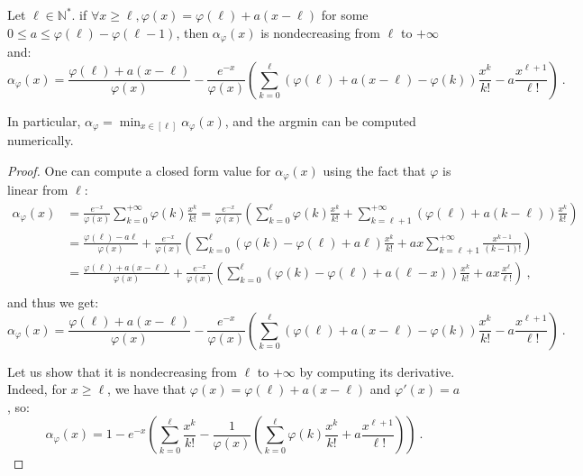 \begin{proposition}
  Let $\ell \in \mathbb{N}^*$. if $\forall x \geq \ell, \varphi(x) = \varphi(\ell) +a(x-\ell)$ for some $0 \leq a \leq \varphi(\ell)-\varphi(\ell-1)$, then $\alpha_{\varphi}(x)$ is nondecreasing from $\ell$ to $+\infty$ and:
  \[\alpha_{\varphi}(x) =  \frac{\varphi(\ell) + a(x-\ell)}{\varphi(x)} - \frac{e^{-x}}{\varphi(x)}\left(\sum_{k=0}^{\ell} \left(\varphi(\ell) + a(x-\ell) - \varphi(k)\right)\frac{x^k}{k!} - a\frac{x^{\ell+1}}{\ell!} \right) \ .\]
  
  In particular, $\alpha_{\varphi} = \min_{x \in [\ell]} \alpha_{\varphi}(x)$, and the argmin can be computed numerically.
  \label{prop:phiLinear}
\end{proposition}

\begin{proof}
  One can compute a closed form value for $\alpha_{\varphi}(x)$ using the fact that $\varphi$ is linear from $\ell$:
  \begin{equation}
    \begin{aligned}
    \alpha_{\varphi}(x) &= \frac{e^{-x}}{\varphi(x)}\sum_{k=0}^{+\infty}\varphi(k)\frac{x^k}{k!} = \frac{e^{-x}}{\varphi(x)}\left(\sum_{k=0}^{\ell}\varphi(k)\frac{x^k}{k!} + \sum_{k=\ell+1}^{+\infty}\left(\varphi(\ell)+a(k-\ell)\right)\frac{x^k}{k!} \right)\\
    &= \frac{\varphi(\ell)-a\ell}{\varphi(x)} + \frac{e^{-x}}{\varphi(x)}\left(\sum_{k=0}^{\ell}\left(\varphi(k) - \varphi(\ell) + a\ell\right)\frac{x^k}{k!} + ax\sum_{k=\ell+1}^{+\infty}\frac{x^{k-1}}{(k-1)!} \right)\\
    &= \frac{\varphi(\ell)+a(x-\ell)}{\varphi(x)} + \frac{e^{-x}}{\varphi(x)}\left(\sum_{k=0}^{\ell}\left(\varphi(k) - \varphi(\ell) + a(\ell-x)\right)\frac{x^k}{k!} + ax\frac{x^{\ell}}{\ell!} \right) \ ,\\
    \end{aligned}
  \end{equation}
  and thus we get:
  \[ \alpha_{\varphi}(x) = \frac{\varphi(\ell) + a(x-\ell)}{\varphi(x)} - \frac{e^{-x}}{\varphi(x)}\left(\sum_{k=0}^{\ell} \left(\varphi(\ell) + a(x-\ell) - \varphi(k)\right)\frac{x^k}{k!} - a\frac{x^{\ell+1}}{\ell!} \right) \ .\]

  Let us show that it is nondecreasing from $\ell$ to $+\infty$ by computing its derivative. Indeed, for $x \geq \ell$, we have that $\varphi(x) = \varphi(\ell) + a(x-\ell)$ and $\varphi'(x) = a$, so:
  \[ \alpha_{\varphi}(x) = 1 - e^{-x}\left(\sum_{k=0}^{\ell} \frac{x^k}{k!} - \frac{1}{\varphi(x)}\left(\sum_{k=0}^{\ell} \varphi(k)\frac{x^k}{k!} + a\frac{x^{\ell+1}}{\ell!}\right) \right) \ . \]


\end{proof}
